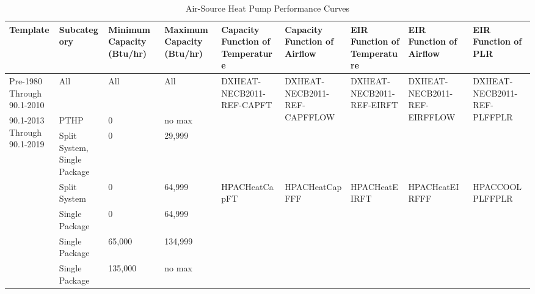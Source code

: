 \begin{table}[htbp]
\scriptsize
\centering
\caption{Air-Source Heat Pump Performance Curves}
\label{tab:ashp_curves}
\begin{tabular}{|p{0.4in}|p{0.5in}|p{0.4in}|p{0.4in}|p{0.5in}|p{0.5in}|p{0.5in}|p{0.5in}|p{0.5in}|}
\hline
\textbf{Template} &
  \textbf{Subcategory} &
  \textbf{Minimum   Capacity (Btu/hr)} &
  \textbf{Maximum   Capacity (Btu/hr)} &
  \textbf{Capacity Function of Temperature} &
  \textbf{Capacity Function of Airflow} &
  \textbf{EIR Function of Temperature} &
  \textbf{EIR Function of Airflow} &
  \textbf{EIR Function of PLR} \\ \hline
Pre-1980 Through 90.1-2010 &
  All &
  All &
  All &
  \multirow{3}{*}{\parbox{0.4in}{DXHEAT-NECB2011-REF-CAPFT}} &
  \multirow{3}{*}{\parbox{0.4in}{DXHEAT-NECB2011-REF-CAPFFLOW}} &
  \multirow{3}{*}{\parbox{0.4in}{DXHEAT-NECB2011-REF-EIRFT}} &
  \multirow{3}{*}{\parbox{0.4in}{DXHEAT-NECB2011-REF-EIRFFLOW}} &
  \multirow{3}{*}{\parbox{0.4in}{DXHEAT-NECB2011-REF-PLFFPLR}} \\ \cline{1-4}
\multirow{6}{*}{\parbox{0.4in}{90.1-2013 Through 90.1-2019}} & PTHP                           & 0       & no max    &  &  &  &  &  \\ \cline{2-4}
                                                            & Split   System, Single Package & 0       & 29,999    &  &  &  &  &  \\ \cline{2-9} 
 &
  Split   System &
  0 &
  64,999 &
  \multirow{4}{*}{\parbox{0.4in}{HPACHeat\-CapFT}} &
  \multirow{4}{*}{\parbox{0.4in}{HPACHeat\-CapFFF}} &
  \multirow{4}{*}{\parbox{0.4in}{HPACHeat\-EIRFT}} &
  \multirow{4}{*}{\parbox{0.4in}{HPACHeat\-EIRFFF}} &
  \multirow{4}{*}{\parbox{0.4in}{HPACCOOL\-PLFFPLR}} \\ \cline{2-4}
                                                            & Single   Package               & 0       & 64,999    &  &  &  &  &  \\ \cline{2-4}
                                                            & Single   Package               & 65,000  & 134,999   &  &  &  &  &  \\ \cline{2-4}
                                                            & Single   Package               & 135,000 & no max    &  &  &  &  &  \\ \hline
\end{tabular}
\end{table}